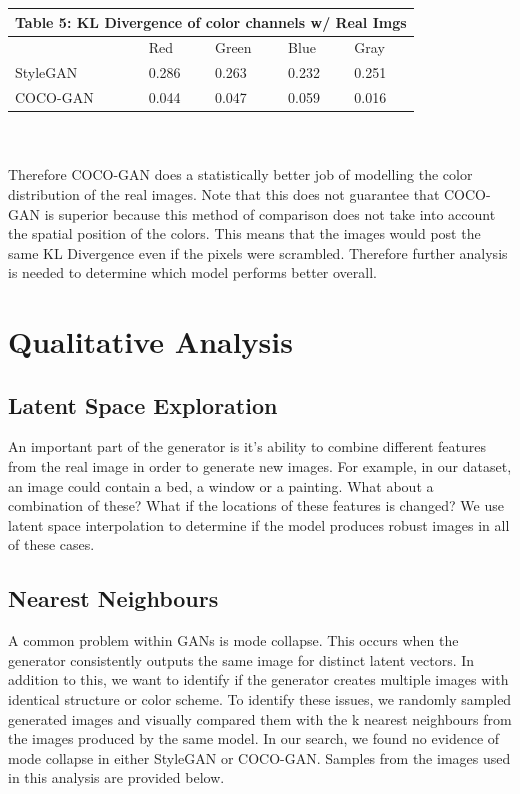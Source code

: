 \documentclass[10pt]{article}
\begin{document}
\begin{multicols*}{2}
        \begin{tabular}{ |p{2cm}|p{1cm}|p{1cm}|p{1cm}|p{1cm}|  }
             \hline
             \multicolumn{5}{|c|}{Table 5: KL Divergence of color channels w/ Real Imgs} \\
             \hline
            & Red & Green & Blue & Gray  \\
            \hline
            StyleGAN & 0.286    & 0.263      & 0.232     &  0.251 \\
            \hline
            COCO-GAN  & 0.044    & 0.047      & 0.059     &  0.016\\
            \hline
        \end{tabular}
        \\\\
        Therefore COCO-GAN does a statistically better job of modelling the color distribution of the real images. Note that this does not guarantee that COCO-GAN is superior because this method of comparison does not take into account the spatial position of the colors. This means that the images would post the same KL Divergence even if the pixels were scrambled. Therefore further analysis is needed to determine which model performs better overall.


        \section{Qualitative Analysis}
        \label{sec:qualitative}
        \subsection{Latent Space Exploration}
        \label{subsec:latentSpaceExploration}
        An important part of the generator is it's ability to combine different features from the real image in order to generate new images.
        For example, in our dataset, an image could contain a bed, a window or a painting. What about a combination of these?
        What if the locations of these features is changed? We use latent space interpolation to determine if the model produces robust images in all of these cases.

        \subsection{Nearest Neighbours}
        \label{subsec:nearestneighbours}
        A common problem within GANs is mode collapse.
        This occurs when the generator consistently outputs the same image for distinct latent vectors.
        In addition to this, we want to identify if the generator creates multiple images with identical structure or color scheme.
        To identify these issues, we randomly sampled generated images and visually compared them with the k nearest neighbours from the images produced by the same model.
        In our search, we found no evidence of mode collapse in either StyleGAN or COCO-GAN. Samples from the images used in this analysis are provided below.


\end{multicols*}
\end{document}
